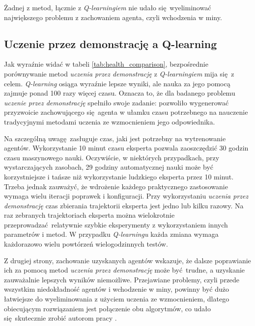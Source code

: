 Żadnej z metod, łącznie z \textit{Q-learningiem} nie udało się wyeliminować największego problemu z zachowaniem agenta, czyli wchodzenia w miny.

\subsection{Uczenie przez demonstrację a Q-learning}

Jak wyraźnie widać w tabeli \ref{tab:health_comparison}, bezpośrednie porównywanie metod \textit{uczenia przez demonstrację} z \textit{Q-learningiem} mija się z celem. \textit{Q-learning} osiąga wyraźnie lepsze wyniki, ale nauka za jego pomocą zajmuje ponad 100 razy więcej czasu. Oznacza to, że dla badanego problemu \textit{uczenie przez demonstrację} spełniło swoje zadanie: pozwoliło wygenerować przyzwoicie zachowującego się agenta w ułamku czasu potrzebnego na nauczenie tradycyjnymi metodami uczenia ze wzmocnieniem jego odpowiednika.

Na szczególną uwagę zasługuje czas, jaki jest potrzebny na wytrenowanie agentów. Wykorzystanie 10 minut czasu eksperta pozwala zaoszczędzić 30 godzin czasu maszynowego nauki. Oczywiście, w niektórych przypadkach, przy wystarczających zasobach, 29 godziny automatycznej nauki może być korzystniejsze i tańsze niż wykorzystanie ludzkiego eksperta przez 10 minut. Trzeba jednak zauważyć, że wdrożenie każdego praktycznego zastosowanie wymaga wielu iteracji poprawek i konfiguracji. Przy wykorzystaniu \textit{uczenia przez demonstrację} czas zbierania trajektorii eksperta jest jedno lub kilku razowy. Na raz zebranych trajektoriach eksperta można wielokrotnie przeprowadzać relatywnie szybkie eksperymenty z wykorzystaniem innych parametrów i metod. W przypadku \textit{Q-learningu} każda zmiana wymaga każdorazowo wielu powtórzeń wielogodzinnych testów.

Z drugiej strony, zachowanie uzyskanych agentów wskazuje, że dalsze poprawianie ich za pomocą metod \textit{uczenia przez demonstrację} może być trudne, a uzyskanie zauważalnie lepszych wyników niemożliwe. Przejawiane problemy, czyli przede wszystkim niedokładność agentów i wchodzenie w miny, powinny być dużo łatwiejsze do wyeliminowania z użyciem uczenia ze wzmocnieniem, dlatego obiecującym rozwiązaniem jest połączenie obu algorytmów, co udało się skutecznie zrobić autorom pracy \cite{DBLP:journals/corr/HesterVPLSPSDOA17}.


